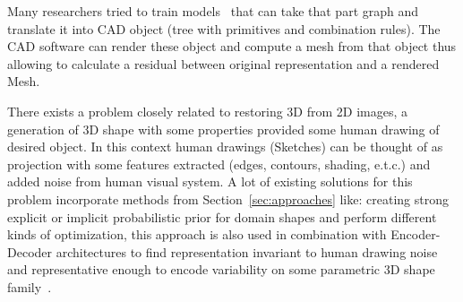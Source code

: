 Many researchers tried to train models~\cite{avetisyan2019scan2cad,Izadinia_2017_CVPR} that can take that part graph and translate it into CAD object (tree with primitives and combination rules). The CAD software can render these object and compute a mesh from that object thus allowing to calculate a residual between original representation and a rendered Mesh.

There exists a problem closely related to restoring 3D from 2D images, a generation of 3D shape with some properties provided some human drawing of desired object. In this context human drawings (Sketches) can be thought of as projection with some features extracted (edges, contours, shading, e.t.c.) and added noise from human visual system.
A lot of existing solutions for this problem incorporate methods from Section~\ref{sec:approaches} like: creating strong explicit or implicit probabilistic prior for domain shapes and perform different kinds of optimization, this approach is also used in combination with Encoder-Decoder architectures to find representation invariant to human drawing noise and representative enough to encode variability on some parametric 3D shape family~\cite{han2017deepsketch2face,xu2014true2form,kulkarni2014inverse}.